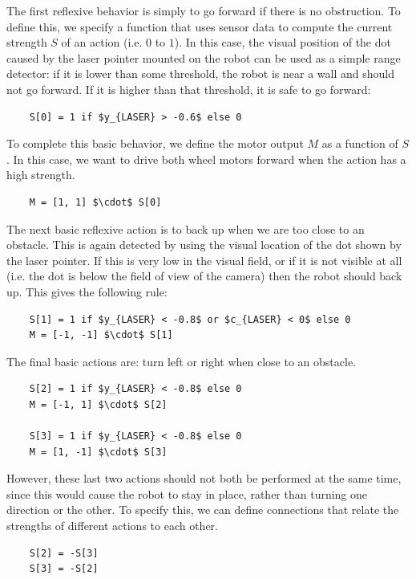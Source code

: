 \documentclass{frontiersSCNS}
\begin{document}
The first reflexive behavior is simply to go forward if there is no 
obstruction. To define this, we specify a function that uses sensor data to 
compute the current strength $S$ of an action (i.e. $0$ to $1$). In this 
case, the visual position of the dot caused by the laser pointer mounted on
the robot can be used as a simple range 
detector: if it is lower than some threshold, the robot is near a wall and 
should not go forward. If it is higher than that threshold, it is safe to 
go forward: 

\begin{lstlisting}
	S[0] = 1 if $y_{LASER} > -0.6$ else 0
\end{lstlisting}

To complete this basic behavior, we define the motor output $M$ as a 
function of $S$. In this case, we want to drive both wheel motors forward 
when the action has a high strength.

\begin{lstlisting}
	M = [1, 1] $\cdot$ S[0]
\end{lstlisting}

The next basic reflexive action is to back up when we are too close to an 
obstacle. This is again detected by using the visual location of the dot
shown by the laser pointer.  If this is very low in the visual field, or if
it is not visible at all (i.e. the dot is below the field of view of the camera)
then the robot should back up.  This gives the following rule:

\begin{lstlisting}
	S[1] = 1 if $y_{LASER} < -0.8$ or $c_{LASER} < 0$ else 0
	M = [-1, -1] $\cdot$ S[1]
\end{lstlisting}

The final basic actions are: turn left or right when close to an obstacle. 

\begin{lstlisting}
	S[2] = 1 if $y_{LASER} < -0.8$ else 0
	M = [-1, 1] $\cdot$ S[2]

	S[3] = 1 if $y_{LASER} < -0.8$ else 0
	M = [1, -1] $\cdot$ S[3]
\end{lstlisting}

However, these last two actions should not both be performed at the same time,
since this would cause the robot to stay in place, rather than turning one
direction or the other. To specify this, we can define connections that relate 
the strengths of different actions to each other.

\begin{lstlisting}
	S[2] = -S[3]
	S[3] = -S[2]
\end{lstlisting}
\end{document}
